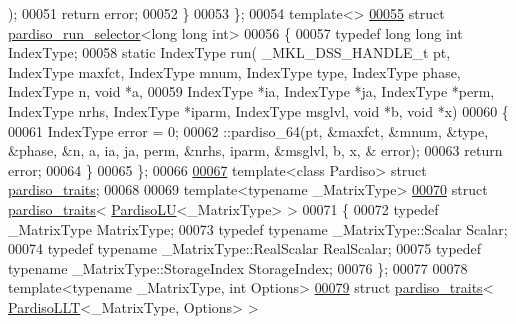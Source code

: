\begin{DoxyCode}
      );
00051       \textcolor{keywordflow}{return} error;
00052     \}
00053   \};
00054   \textcolor{keyword}{template}<>
\hyperlink{struct_eigen_1_1internal_1_1pardiso__run__selector_3_01long_01long_01int_01_4}{00055}   \textcolor{keyword}{struct }\hyperlink{struct_eigen_1_1internal_1_1pardiso__run__selector}{pardiso\_run\_selector}<long long int>
00056   \{
00057     \textcolor{keyword}{typedef} \textcolor{keywordtype}{long} \textcolor{keywordtype}{long} \textcolor{keywordtype}{int} IndexType;
00058     \textcolor{keyword}{static} IndexType run( \_MKL\_DSS\_HANDLE\_t pt, IndexType maxfct, IndexType mnum, IndexType type, IndexType
       phase, IndexType n, \textcolor{keywordtype}{void} *a,
00059                       IndexType *ia, IndexType *ja, IndexType *perm, IndexType nrhs, IndexType *iparm, 
      IndexType msglvl, \textcolor{keywordtype}{void} *b, \textcolor{keywordtype}{void} *x)
00060     \{
00061       IndexType error = 0;
00062       ::pardiso\_64(pt, &maxfct, &mnum, &type, &phase, &n, a, ia, ja, perm, &nrhs, iparm, &msglvl, b, x, &
      error);
00063       \textcolor{keywordflow}{return} error;
00064     \}
00065   \};
00066 
\hyperlink{struct_eigen_1_1internal_1_1pardiso__traits}{00067}   \textcolor{keyword}{template}<\textcolor{keyword}{class} Pardiso> \textcolor{keyword}{struct }\hyperlink{struct_eigen_1_1internal_1_1pardiso__traits}{pardiso\_traits};
00068 
00069   \textcolor{keyword}{template}<\textcolor{keyword}{typename} \_MatrixType>
\hyperlink{struct_eigen_1_1internal_1_1pardiso__traits_3_01_pardiso_l_u_3_01___matrix_type_01_4_01_4}{00070}   \textcolor{keyword}{struct }\hyperlink{struct_eigen_1_1internal_1_1pardiso__traits}{pardiso\_traits}< \hyperlink{class_eigen_1_1_pardiso_l_u}{PardisoLU}<\_MatrixType> >
00071   \{
00072     \textcolor{keyword}{typedef} \_MatrixType MatrixType;
00073     \textcolor{keyword}{typedef} \textcolor{keyword}{typename} \_MatrixType::Scalar Scalar;
00074     \textcolor{keyword}{typedef} \textcolor{keyword}{typename} \_MatrixType::RealScalar RealScalar;
00075     \textcolor{keyword}{typedef} \textcolor{keyword}{typename} \_MatrixType::StorageIndex StorageIndex;
00076   \};
00077 
00078   \textcolor{keyword}{template}<\textcolor{keyword}{typename} \_MatrixType, \textcolor{keywordtype}{int} Options>
\hyperlink{struct_eigen_1_1internal_1_1pardiso__traits_3_01_pardiso_l_l_t_3_01___matrix_type_00_01_options_01_4_01_4}{00079}   \textcolor{keyword}{struct }\hyperlink{struct_eigen_1_1internal_1_1pardiso__traits}{pardiso\_traits}< \hyperlink{class_eigen_1_1_pardiso_l_l_t}{PardisoLLT}<\_MatrixType, Options> >

\end{DoxyCode}
